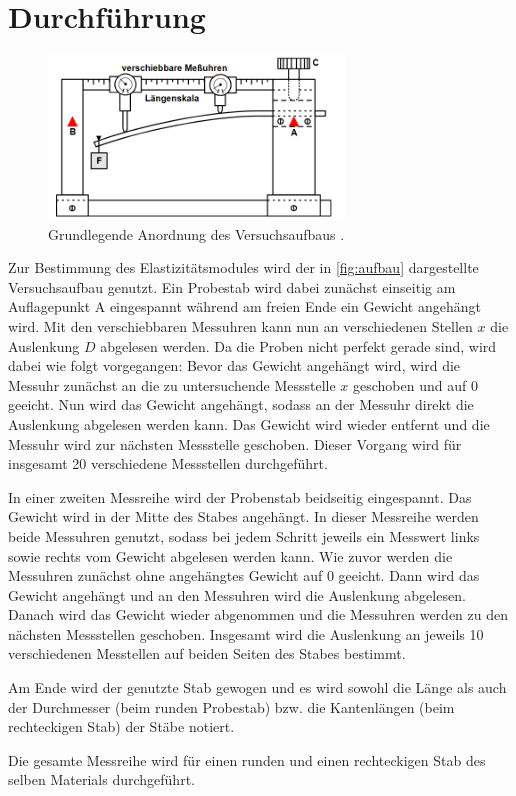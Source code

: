 \section{Durchführung}
\label{sec:Durchführung}
\begin{figure}[h]
    \centering
    \includegraphics[width=0.7\textwidth]{assets/aufbau.png}
    \caption{Grundlegende Anordnung des Versuchsaufbaus \cite{V103}.}
    \label{fig:aufbau}
\end{figure}
Zur Bestimmung des Elastizitätsmodules wird der in \autoref{fig:aufbau} dargestellte Versuchsaufbau genutzt.
Ein Probestab wird dabei zunächst einseitig am Auflagepunkt A eingespannt während am freien Ende ein Gewicht angehängt wird.
Mit den verschiebbaren Messuhren kann nun an verschiedenen Stellen $x$ die Auslenkung $D$ abgelesen werden. Da die
Proben nicht perfekt gerade sind, wird dabei wie folgt vorgegangen:
Bevor das Gewicht angehängt wird, wird die Messuhr zunächst an die zu untersuchende Messstelle $x$ geschoben und auf $0$ geeicht.
Nun wird das Gewicht angehängt, sodass an der Messuhr direkt die Auslenkung abgelesen werden kann. Das Gewicht wird wieder entfernt
und die Messuhr wird zur nächsten Messstelle geschoben. Dieser Vorgang wird für insgesamt 20 verschiedene Messstellen durchgeführt.

\noindent In einer zweiten Messreihe wird der Probenstab beidseitig eingespannt. Das Gewicht wird in der Mitte des Stabes angehängt. In dieser
Messreihe werden beide Messuhren genutzt, sodass bei jedem Schritt jeweils ein Messwert links sowie rechts vom Gewicht abgelesen werden kann.
Wie zuvor werden die Messuhren zunächst ohne angehängtes Gewicht auf 0 geeicht. Dann wird das Gewicht angehängt und an den Messuhren wird die Auslenkung abgelesen.
Danach wird das Gewicht wieder abgenommen und die Messuhren werden zu den nächsten Messstellen geschoben. Insgesamt wird die Auslenkung an jeweils 10 verschiedenen
Messtellen auf beiden Seiten des Stabes bestimmt.

\noindent Am Ende wird der genutzte Stab gewogen und es wird sowohl die Länge als auch der Durchmesser (beim runden Probestab) bzw. die Kantenlängen (beim rechteckigen Stab)
der Stäbe notiert.

\noindent Die gesamte Messreihe wird für einen runden und einen rechteckigen Stab des selben Materials durchgeführt.
